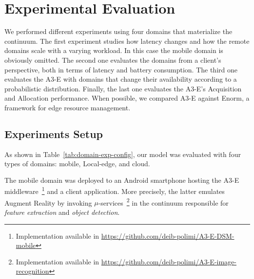 
\section{Experimental Evaluation}\label{sec:evaluation}

We performed different experiments using four domains that materialize the continuum. 
The first experiment studies how latency changes and how the remote domains scale with a varying workload. 
In this case the mobile domain is obviously omitted. The second one evaluates the domains from a client's perspective, both in terms of latency and battery consumption. The third one evaluates the A3-E with domains that change their availability according to a probabilistic distribution. Finally, the last one evaluates the A3-E's Acquisition and Allocation performance. When possible, we compared A3-E against Enorm, a framework for edge resource management.

\subsection{Experiments Setup}


As shown in Table~\ref{tab:domain-exp-config}, our model was evaluated with four types of domains: mobile, Local-edge, and cloud. 

The mobile domain was deployed to an Android smartphone hosting the A3-E middleware~\footnote{Implementation available in \url{https://github.com/deib-polimi/A3-E-DSM-mobile}} and a client application. More precisely, the latter emulates Augment Reality by invoking
$\mu$-services~\footnote{Implementation available in \url{https://github.com/deib-polimi/A3-E-image-recognition}} in the continuum responsible for \textit{feature extraction} and \textit{object detection}. 

